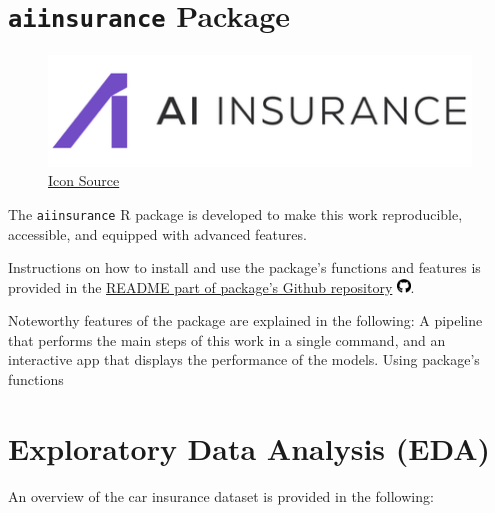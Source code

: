 \documentclass{article}
\begin{document}
\hypertarget{aiinsurance-package}{%
\section{\texorpdfstring{\texttt{aiinsurance} Package
\label{sec:package}}{aiinsurance Package }}\label{aiinsurance-package}}

\begin{figure}
\includegraphics[width=0.9\linewidth]{"./figures/logo.png"}
\captionsetup{justification=raggedright,singlelinecheck=false}
\caption*{ \tiny \href{https://aiinsurance.io/}{Icon Source}}
\end{figure}

The \texttt{aiinsurance} R package \cite{package} is developed to make
this work reproducible, accessible, and equipped with advanced features.

Instructions on how to install and use the package's functions and
features is provided in the
\href{https://github.com/berserkhmdvhb/aiinsurance\#readme}{README part
of package's Github repository}
\includegraphics[width=0.97em,height=1em]{report_files/figure-latex/fa-icon-9e25601f72c0b4fff1c079a486ca8bba.pdf}.

Noteworthy features of the package are explained in the following: A
pipeline that performs the main steps of this work in a single command,
and an interactive app that displays the performance of the models.
Using package's functions

\hypertarget{exploratory-data-analysis-eda}{%
\section{\texorpdfstring{Exploratory Data Analysis (EDA)
\label{sec:data}}{Exploratory Data Analysis (EDA) }}\label{exploratory-data-analysis-eda}}

An overview of the car insurance dataset is provided in the following:
\tiny
\end{document}
